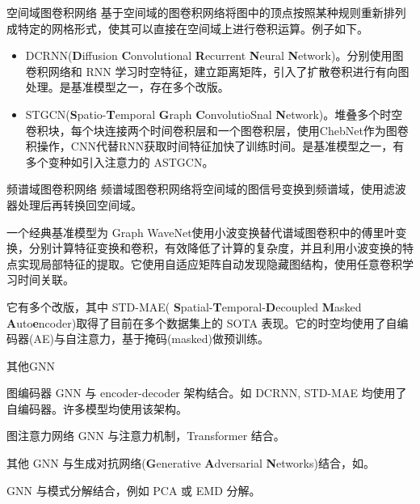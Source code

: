 \documentclass{libs/format}
\begin{document}
\begin{frame}{空间域图卷积网络}
  基于空间域的图卷积网络将图中的顶点按照某种规则重新排列成特定的网格形式，使其可以直接在空间域上进行卷积运算。\cite{T-ZS37}例子如下。

  \begin{itemize}
    \item DCRNN(\textbf{D}iffusion \textbf{C}onvolutional \textbf{R}ecurrent \textbf{N}eural \textbf{N}etwork)\cite{T-40}。分别使用图卷积网络和 RNN 学习时空特征，建立距离矩阵，引入了扩散卷积进行有向图处理。是基准模型之一，存在多个改版。
    \item STGCN(\textbf{S}patio-\textbf{T}emporal \textbf{G}raph \textbf{C}onvolutioSnal \textbf{N}etwork)\cite{T-28}。堆叠多个时空卷积块，每个块连接两个时间卷积层和一个图卷积层，使用ChebNet作为图卷积操作，CNN代替RNN获取时间特征加快了训练时间。是基准模型之一，有多个变种如引入注意力的 ASTGCN\cite{T-81}。
  \end{itemize}
\end{frame}

\begin{frame}{频谱域图卷积网络}
  频谱域图卷积网络将空间域的图信号变换到频谱域，使用滤波器处理后再转换回空间域。

  一个经典基准模型为 Graph WaveNet\cite{T-64}使用小波变换替代谱域图卷积中的傅里叶变换，分别计算特征变换和卷积，有效降低了计算的复杂度，并且利用小波变换的特点实现局部特征的提取。它使用自适应矩阵自动发现隐藏图结构，使用任意卷积学习时间关联。
  
  它有多个改版，其中 STD-MAE( \textbf{S}patial-\textbf{T}emporal-\textbf{D}ecoupled \textbf{M}asked \textbf{A}uto\textbf{e}ncoder)\cite{T-135}取得了目前在多个数据集上的 SOTA 表现。它的时空均使用了自编码器(AE)与自注意力，基于掩码(masked)做预训练。
\end{frame}

\begin{frame}{其他GNN}
  \begin{block}{图编码器}
    GNN 与 encoder-decoder 架构结合。如 DCRNN, STD-MAE 均使用了自编码器。许多模型均使用该架构。
  \end{block}
  \begin{block}{图注意力网络}
    GNN 与注意力机制，Transformer 结合。
  \end{block}
  \begin{block}{其他}
    GNN 与生成对抗网络(\textbf{G}enerative \textbf{A}dversarial \textbf{N}etworks)结合，如\cite{T-244}。

    GNN 与模式分解结合，例如 PCA 或 EMD 分解\cite{T-247}。
  \end{block}
\end{frame}
\end{document}
